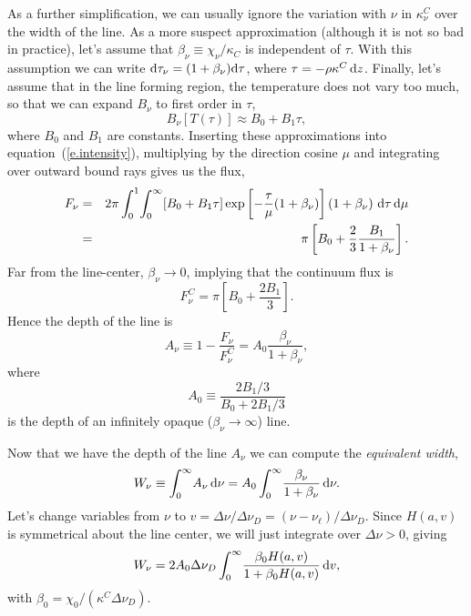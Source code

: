 As a further simplification, we can usually ignore the variation with $\nu$ in $\kappa_{\nu}^{C}$ over the width of the line. As a more suspect approximation (although it is not so bad in practice), let's assume that $\beta_{\nu} \equiv \chi_{\nu}/\kappa_{C}$ is independent of $\tau$. With this assumption we can write $\mathrm{d}\tau_{\nu} = (1+\beta_{\nu})\mathrm{d}\tau$, where $\tau = -\rho\kappa^{C}\,\mathrm{d} z$. Finally, let's assume that in the line forming region, the temperature does not vary too much, so that we can expand $B_{\nu}$ to first order in $\tau$,
\[ B_{\nu}[T(\tau)] \approx B_{0} + B_{1}\tau, \]
where $B_{0}$ and $B_{1}$ are constants.
Inserting these approximations into equation~(\ref{e.intensity}), multiplying by the direction cosine $\mu$ and integrating over outward bound rays gives us the flux,
\begin{eqnarray}\label{e.flux}
F_{\nu} &=& 2\pi\int_{0}^{1}\!\int_{0}^{\infty}\!\left[B_{0}+B_{1}\tau\right]\exp\left[-\frac{\tau}{\mu}(1+\beta_{\nu})\right] \left(1+\beta_{\nu}\right) \,\mathrm{d}\tau\,\mathrm{d}\mu\nonumber\\
 &=& \pi\left[ B_{0} + \frac{2}{3}\frac{B_{1}}{1+\beta_{\nu}}\right].
\end{eqnarray}
Far from the line-center, $\beta_{\nu}\to 0$, implying that the continuum flux is
\[ F_{\nu}^{C} = \pi\left[B_{0} + \frac{2B_{1}}{3}\right]. \]
Hence the depth of the line is
\begin{equation}\label{e.line-depth}
A_{\nu} \equiv 1 - \frac{F_{\nu}}{F_{\nu}^{C}} = A_{0}\frac{\beta_{\nu}}{1+\beta_{\nu}},
\end{equation}
where
\begin{equation}\label{e.A0-curve-growth}
 A_{0} \equiv \frac{2B_{1}/3}{B_{0} + 2B_{1}/3}
 \end{equation}
is the depth of an infinitely opaque ($\beta_{\nu}\to\infty$) line. 

\noindent Now that we have the depth of the line $A_{\nu}$ we can compute the \emph{equivalent width},
\begin{equation}\label{e.W}
W_{\nu} \equiv \int_{0}^{\infty}\! A_{\nu}\,\mathrm{d}\nu = A_{0}\int_{0}^{\infty}\!\frac{\beta_{\nu}}{1+\beta_{\nu}}\,\mathrm{d}\nu.
\end{equation}
Let's change variables from $\nu$ to $v = \Delta\nu/\Delta\nu_{D} = (\nu-\nu_{\ell})/\Delta\nu_{D}$.  Since $H(a,v)$ is symmetrical about the line center, we will just integrate over $\Delta\nu >0$, giving
\begin{equation}\label{e.Wv}
 W_{\nu} = 2A_{0}\Delta\nu_{D}\int_{0}^{\infty}\!\frac{\beta_{0}H(a,v)}{1+\beta_{0}H(a,v)}\,\mathrm{d} v,
 \end{equation}
with $\beta_{0} = \chi_{0}/(\kappa^{C}\Delta\nu_{D})$.

